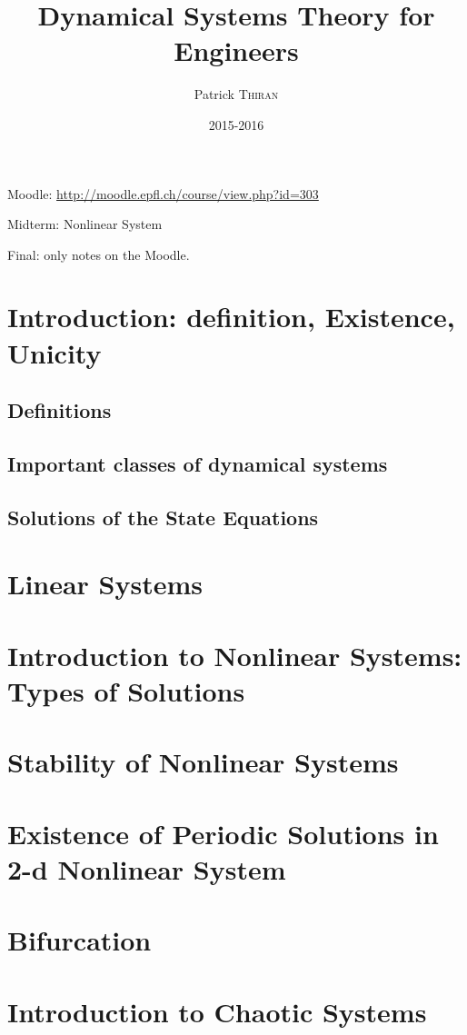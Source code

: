 

\title{Dynamical Systems Theory for Engineers}
\author{Patrick \textsc{Thiran}}
\date{2015-2016}


\maketitle
\tableofcontents

\newpage

Moodle: \url{http://moodle.epfl.ch/course/view.php?id=303}

Midterm: Nonlinear System

Final: only notes on the Moodle.

\chapter{Introduction: definition, Existence, Unicity}
    \section{Definitions}
        
    \section{Important classes of dynamical systems}
        
    \section{Solutions of the State Equations}
        

\chapter{Linear Systems}

\chapter{Introduction to Nonlinear Systems: Types of Solutions}

\chapter{Stability of Nonlinear Systems}

\chapter{Existence of Periodic Solutions in 2-d Nonlinear System}

\chapter{Bifurcation}

\chapter{Introduction to Chaotic Systems}



\nocite{*}







